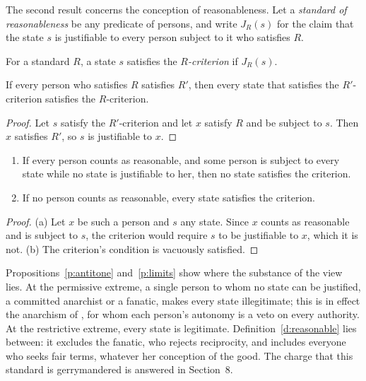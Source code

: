 \documentclass{situationist-preprint}
\begin{document}
The second result concerns the conception of reasonableness. Let a \emph{standard of reasonableness} be any predicate of persons, and write $J_R(s)$ for the claim that the state $s$ is justifiable to every person subject to it who satisfies $R$.

\begin{definition}\label{d:relative}
For a standard $R$, a state $s$ satisfies the \emph{$R$-criterion} if $J_R(s)$.
\end{definition}

\begin{proposition}[Antitonicity]\label{p:antitone}
If every person who satisfies $R$ satisfies $R'$, then every state that satisfies the $R'$-criterion satisfies the $R$-criterion.
\end{proposition}

\begin{proof}
Let $s$ satisfy the $R'$-criterion and let $x$ satisfy $R$ and be subject to $s$. Then $x$ satisfies $R'$, so $s$ is justifiable to $x$.
\end{proof}

\begin{proposition}\label{p:limits}
\begin{enumerate}[label=(\alph*)]
\item If every person counts as reasonable, and some person is subject to every state while no state is justifiable to her, then no state satisfies the criterion.
\item If no person counts as reasonable, every state satisfies the criterion.
\end{enumerate}
\end{proposition}

\begin{proof}
(a) Let $x$ be such a person and $s$ any state. Since $x$ counts as reasonable and is subject to $s$, the criterion would require $s$ to be justifiable to $x$, which it is not. (b) The criterion's condition is vacuously satisfied.
\end{proof}

Propositions~\ref{p:antitone} and~\ref{p:limits} show where the substance of the view lies. At the permissive extreme, a single person to whom no state can be justified, a committed anarchist or a fanatic, makes every state illegitimate; this is in effect the anarchism of \citet{Wolff1970}, for whom each person's autonomy is a veto on every authority. At the restrictive extreme, every state is legitimate. Definition~\ref{d:reasonable} lies between: it excludes the fanatic, who rejects reciprocity, and includes everyone who seeks fair terms, whatever her conception of the good. The charge that this standard is gerrymandered is answered in Section~8.
\end{document}
